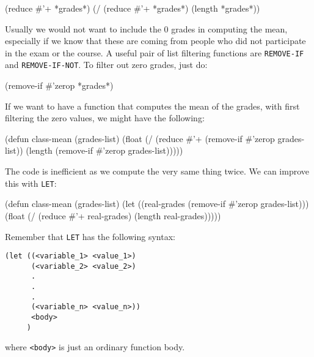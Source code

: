\documentclass[a4paper,11pt]{article}
\begin{document}
\begin{uenum}
\begin{lispcode}
(reduce #'+ *grades*)
(/ (reduce #'+ *grades*) (length *grades*))
\end{lispcode}

\item Usually we would not want to include the 0 grades in computing the mean, especially if we know that these are coming from people who did not participate in the exam or the course. A useful pair of list filtering functions are \Verb+REMOVE-IF+ and \Verb+REMOVE-IF-NOT+. To filter out zero grades, just do:  

\begin{lispcode}
(remove-if #'zerop *grades*)
\end{lispcode}

\item If we want to have a function that computes the mean of the grades, with first filtering the zero values, we might have the following:

\begin{lispcode}
(defun class-mean (grades-list)
  (float (/
		   (reduce #'+ (remove-if #'zerop grades-list))
		   (length (remove-if #'zerop grades-list)))))
\end{lispcode}

\item The code is inefficient as we compute the very same thing twice. We can improve this with \Verb+LET+:

\begin{lispcode}
(defun class-mean (grades-list)
  (let ((real-grades (remove-if #'zerop grades-list))) 
	(float (/ (reduce #'+ real-grades) (length real-grades)))))
\end{lispcode}

\item Remember that \Verb+LET+ has the following syntax:


% 

\begin{ucodeframe}
\begin{Verbatim}
(let ((<variable_1> <value_1>)
      (<variable_2> <value_2>)
	  .  
	  .
	  .
      (<variable_n> <value_n>))
      <body>
     )
\end{Verbatim}
\end{ucodeframe}
where \Verb+<body>+ is just an ordinary function body.

\end{uenum}
\end{document}
